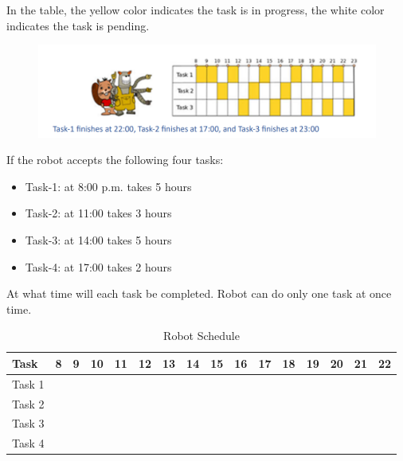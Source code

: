 \documentclass[12pt,titlepage]{article}
\newcommand{\y}{\cellcolor{yellow!75}}
\begin{document}
In the table, the yellow color indicates the task is in progress, the white color indicates the task is pending.

\begin{figure}[h]
    \centering
    \includegraphics*[width=\textwidth]{./images/robot-table.png}
\end{figure}

If the robot accepts the following four tasks:

\begin{itemize}
    \item Task-1: at 8:00 p.m. takes 5 hours
    \item Task-2: at 11:00 takes 3 hours
    \item Task-3: at 14:00 takes 5 hours
    \item Task-4: at 17:00 takes 2 hours
\end{itemize}

\pagebreak

At what time will each task be completed. Robot can do only one task at once time.

\begin{table}[h]
    \caption{Robot Schedule}
    \begin{tabularx}{\textwidth}{|l|c|c|c|c|c|c|c|c|c|c|c|c|c|c|c|}
        \hline
        \textbf{Task} & \textbf{8} & \textbf{9} & \textbf{10} & \textbf{11} & \textbf{12} & \textbf{13} & \textbf{14} & \textbf{15} & \textbf{16} & \textbf{17} & \textbf{18} & \textbf{19} & \textbf{20} & \textbf{21} & \textbf{22} \\
        \hline
        Task 1 & \y & \y & \y &   & \y &   &   & \y &   &   &   &   &   &   &   \\
        \hline
        Task 2 &   &   &   & \y &   & \y &   &   & \y &   &   &   &   &   &   \\
        \hline
        Task 3 &   &   &   &   &   &   & \y &   &   &   & \y &   & \y & \y & \y \\
        \hline
        Task 4 &   &   &   &   &   &   &   &   &   & \y &   & \y &   &   &   \\
        \hline
    \end{tabularx}
\end{table}
\end{document}
